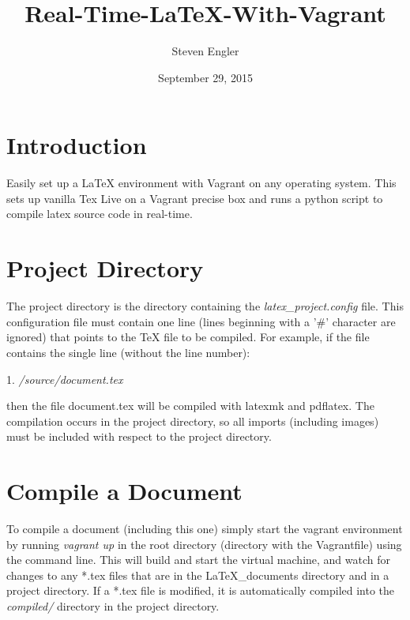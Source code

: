 \documentclass[12pt]{article}
\title{Real-Time-\LaTeX{}-With-Vagrant}
\author{Steven Engler}
\date{September 29, 2015}
\begin{document}
\maketitle

\section{Introduction}
Easily set up a LaTeX environment with Vagrant on any operating system. This sets up vanilla Tex Live on a Vagrant precise box and runs a python script to compile latex source code in real-time.

\section{Project Directory}
The project directory is the directory containing the \textit{latex\_project.config} file. This configuration file must contain one line (lines beginning with a '\#' character are ignored) that points to the \TeX{} file to be compiled. For example, if the file contains the single line (without the line number):

\vspace*{0.5\baselineskip}
1. \textit{/source/document.tex}
\vspace*{0.5\baselineskip}

\noindent then the file document.tex will be compiled with latexmk and pdflatex. The compilation occurs in the project directory, so all imports (including images) must be included with respect to the project directory.

\section{Compile a Document}
To compile a document (including this one) simply start the vagrant environment by running \textit{vagrant up} in the root directory (directory with the Vagrantfile) using the command line. This will build and start the virtual machine, and watch for changes to any *.tex files that are in the LaTeX\_documents directory and in a project directory. If a *.tex file is modified, it is automatically compiled into the \textit{compiled/} directory in the project directory.
\end{document}
